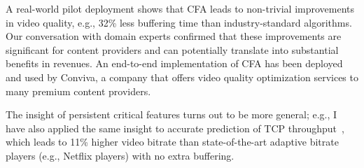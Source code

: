 A real-world pilot deployment shows that CFA leads to non-trivial improvements in video quality, e.g., 32\% less buffering time than industry-standard algorithms.
Our conversation with domain experts confirmed that these improvements are significant for content providers and can potentially translate into substantial benefits in revenues.
An end-to-end implementation of CFA has been deployed and used by Conviva, a company that offers video quality optimization services to many premium content providers. 

The insight of persistent critical features turns out to be more general; e.g., I have also applied the same insight to accurate prediction of TCP throughput~\cite{cs2p}, which leads to 11\% higher video bitrate than state-of-the-art adaptive bitrate players (e.g., Netflix players) with no extra buffering.


